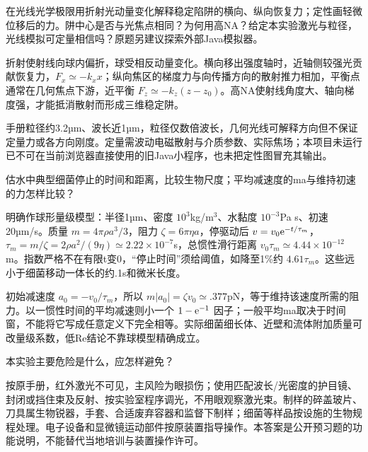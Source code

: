 \begin{exercise}\label{task:exp51-1}
在光线光学极限用折射光动量变化解释稳定陷阱的横向、纵向恢复力；定性画轻微位移后的力。阱中心是否与光焦点相同？为何用高NA？给定本实验激光与粒径，光线模拟可定量相信吗？原题另建议探索外部Java模拟器。
\end{exercise}
\begin{solution}
折射使射线向球内偏折，球受相反动量变化。横向移出强度轴时，近轴侧较强光贡献恢复力，$F_x\simeq-k_xx$；纵向焦区的梯度力与向传播方向的散射推力相加，平衡点通常在几何焦点下游，近平衡 $F_z\simeq-k_z(z-z_0)$。高NA使射线角度大、轴向梯度强，才能抵消散射而形成三维稳定阱。
\begin{center}\end{center}
手册粒径约3.2µm、波长近1µm，粒径仅数倍波长，几何光线可解释方向但不保证定量力或各方向刚度。定量需波动电磁散射与介质参数、实际焦场；本项目未运行已不可在当前浏览器直接使用的旧Java小程序，也未把定性图冒充其输出。
\end{solution}
\begin{exercise}\label{task:exp51-2}
估水中典型细菌停止的时间和距离，比较生物尺度；平均减速度的ma与维持初速的力怎样比较？
\end{exercise}
\begin{solution}
明确作球形量级模型：半径1µm、密度 $10^3$kg/m$^3$、水黏度 $10^{-3}$Pa s、初速20µm/s。质量 $m=4\pi\rho a^3/3$，阻力 $\zeta=6\pi\eta a$，停驱动后 $v=v_0\mathrm e^{-t/\tau_m}$，$\tau_m=m/\zeta=2\rho a^2/(9\eta)\simeq2.22\times10^{-7}$s，总惯性滑行距离 $v_0\tau_m\simeq4.44\times10^{-12}$m。指数严格不在有限t变0，“停止时间”须给阈值，如降至1\%约 $4.61\tau_m$。这些远小于细菌移动一体长的约.1s和微米长度。

初始减速度 $a_0=-v_0/\tau_m$，所以 $m|a_0|=\zeta v_0\simeq.377$pN，等于维持该速度所需的阻力。以一惯性时间的平均减速则小一个 $1-\mathrm e^{-1}$ 因子；一般平均ma取决于时间窗，不能将它写成任意定义下完全相等。实际细菌细长体、近壁和流体附加质量可改量级系数，低Re结论不靠球模型精确成立。
\end{solution}
\begin{exercise}\label{task:exp51-3}
本实验主要危险是什么，应怎样避免？
\end{exercise}
\begin{solution}
按原手册，红外激光不可见，主风险为眼损伤；使用匹配波长/光密度的护目镜、封闭或挡住束及反射、按实验室程序调光，不用眼观察激光束。制样的碎盖玻片、刀具属生物锐器，手套、合适废弃容器和监督下制样；细菌等样品按设施的生物规程处理。电子设备和显微镜运动部件按原装置指导操作。本答案是公开预习题的功能说明，不能替代当地培训与装置操作许可。
\end{solution}
